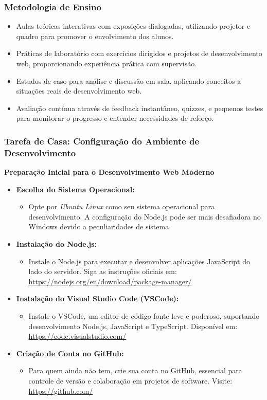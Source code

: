 \begin{frame}[fragile]
  \frametitle{Metodologia de Ensino}
  \begin{itemize}
    \item Aulas teóricas interativas com exposições dialogadas, utilizando projetor e quadro para promover o envolvimento dos alunos.
    \item Práticas de laboratório com exercícios dirigidos e projetos de desenvolvimento web, proporcionando experiência prática com supervisão.
    \item Estudos de caso para análise e discussão em sala, aplicando conceitos a situações reais de desenvolvimento web.
    \item Avaliação contínua através de feedback instantâneo, quizzes, e pequenos testes para monitorar o progresso e entender necessidades de reforço.
  \end{itemize}
\end{frame}
\begin{frame}[fragile]
  \frametitle{Tarefa de Casa: Configuração do Ambiente de Desenvolvimento}
  \textbf{Preparação Inicial para o Desenvolvimento Web Moderno}
  \begin{itemize}
    \item \textbf{Escolha do Sistema Operacional:}
    \begin{itemize}
      \item Opte por \textit{Ubuntu Linux} como seu sistema operacional para desenvolvimento. A configuração do Node.js pode ser mais desafiadora no Windows devido a peculiaridades de sistema.
    \end{itemize}
    
    \item \textbf{Instalação do Node.js:}
    \begin{itemize}
      \item Instale o Node.js para executar e desenvolver aplicações JavaScript do lado do servidor. Siga as instruções oficiais em: \url{https://nodejs.org/en/download/package-manager/}
    \end{itemize}
    
    \item \textbf{Instalação do Visual Studio Code (VSCode):}
    \begin{itemize}
      \item Instale o VSCode, um editor de código fonte leve e poderoso, suportando desenvolvimento Node.js, JavaScript e TypeScript. Disponível em: \url{https://code.visualstudio.com/}
    \end{itemize}
    
    \item \textbf{Criação de Conta no GitHub:}
    \begin{itemize}
      \item Para quem ainda não tem, crie sua conta no GitHub, essencial para controle de versão e colaboração em projetos de software. Visite: \url{https://github.com/}
    \end{itemize}
  \end{itemize}
\end{frame}
